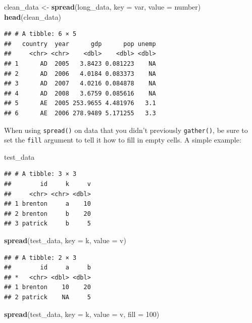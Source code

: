 \documentclass[12pt,oneside,openany]{tufte-book}
\newenvironment{Shaded}{}{}
\newcommand{\KeywordTok}[1]{\textcolor[rgb]{0.00,0.44,0.13}{\textbf{{#1}}}}
\newcommand{\DataTypeTok}[1]{\textcolor[rgb]{0.56,0.13,0.00}{{#1}}}
\newcommand{\DecValTok}[1]{\textcolor[rgb]{0.25,0.63,0.44}{{#1}}}
\newcommand{\StringTok}[1]{\textcolor[rgb]{0.25,0.44,0.63}{{#1}}}
\newcommand{\NormalTok}[1]{{#1}}
\begin{document}
\begin{Shaded}
\begin{Highlighting}[]
\NormalTok{clean_data <-}\StringTok{ }\KeywordTok{spread}\NormalTok{(long_data, }\DataTypeTok{key =} \NormalTok{var, }\DataTypeTok{value =} \NormalTok{number)}
\KeywordTok{head}\NormalTok{(clean_data)}
\end{Highlighting}
\end{Shaded}

\begin{verbatim}
## # A tibble: 6 × 5
##   country  year      gdp      pop unemp
##     <chr> <chr>    <dbl>    <dbl> <dbl>
## 1      AD  2005   3.8423 0.081223    NA
## 2      AD  2006   4.0184 0.083373    NA
## 3      AD  2007   4.0216 0.084878    NA
## 4      AD  2008   3.6759 0.085616    NA
## 5      AE  2005 253.9655 4.481976   3.1
## 6      AE  2006 278.9489 5.171255   3.3
\end{verbatim}

When using \texttt{spread()} on data that you didn't previously
\texttt{gather()}, be sure to set the \texttt{fill} argument to tell it
how to fill in empty cells. A simple example:

\begin{Shaded}
\begin{Highlighting}[]
\NormalTok{test_data}
\end{Highlighting}
\end{Shaded}

\begin{verbatim}
## # A tibble: 3 × 3
##        id     k     v
##     <chr> <chr> <dbl>
## 1 brenton     a    10
## 2 brenton     b    20
## 3 patrick     b     5
\end{verbatim}

\begin{Shaded}
\begin{Highlighting}[]
\KeywordTok{spread}\NormalTok{(test_data, }\DataTypeTok{key =} \NormalTok{k, }\DataTypeTok{value =} \NormalTok{v)}
\end{Highlighting}
\end{Shaded}

\begin{verbatim}
## # A tibble: 2 × 3
##        id     a     b
## *   <chr> <dbl> <dbl>
## 1 brenton    10    20
## 2 patrick    NA     5
\end{verbatim}

\begin{Shaded}
\begin{Highlighting}[]
\KeywordTok{spread}\NormalTok{(test_data, }\DataTypeTok{key =} \NormalTok{k, }\DataTypeTok{value =} \NormalTok{v, }\DataTypeTok{fill =} \DecValTok{100}\NormalTok{)}
\end{Highlighting}
\end{Shaded}
\end{document}
